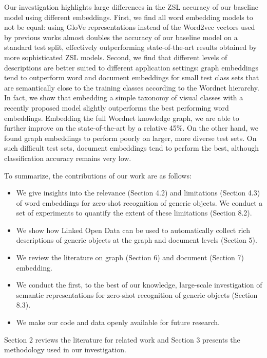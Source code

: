 Our investigation highlights large differences in the ZSL accuracy of our baseline model using different embeddings. First, we find all word embedding models to not be equal: using GloVe \cite{pennington2014glove} representations instead of the Word2vec \cite{mikolov2013distributed} vectors used by previous works almost doubles the accuracy of our baseline model on a standard test split, effectively outperforming state-of-the-art results obtained by more sophisticated ZSL models. Second, we find that different levels of descriptions are better suited to different application settings: graph embeddings tend to outperform word and document embeddings for small test class sets that are semantically close to the training classes according to the Wordnet hierarchy. In fact, we show that embedding a simple taxonomy of visual classes with a recently proposed model \cite{nickel2017poincare} slightly outperforms the best performing word embeddings. Embedding the full Wordnet knowledge graph, we are able to further improve on the state-of-the-art by a relative 45\%. On the other hand, we found graph embeddings to perform poorly on larger, more diverse test sets. On such difficult test sets, document embeddings tend to perform the best, although classification accuracy remains very low.

To summarize, the contributions of our work are as follows:
\begin{itemize}
  \item We give insights into the relevance (Section 4.2) and limitations (Section 4.3) of word embeddings for zero-shot recognition of generic objects. We conduct a set of experiments to quantify the extent of these limitations (Section 8.2).
  \item We show how Linked Open Data can be used to automatically collect rich descriptions of generic objects at the graph and document levels (Section 5).
  \item We review the literature on graph (Section 6) and document (Section 7) embedding.
  \item We conduct the first, to the best of our knowledge, large-scale investigation of semantic representations for zero-shot recognition of generic objects (Section 8.3).
  \item We make our code and data openly available for future research.
\end{itemize}

Section 2 reviews the literature for related work and Section 3 presents the methodology used in our investigation.

